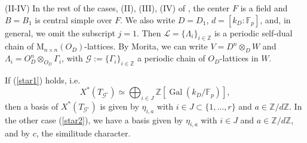 \documentclass[reqno, 10pt]{amsart}
\newcommand{\BF}{\ensuremath{\mathbb {F}}\xspace}
\newcommand{\BZ}{\ensuremath{\mathbb {Z}}\xspace}
\newcommand{\CG}{\ensuremath{\mathcal {G}}\xspace}
\newcommand{\RM}{\ensuremath{\mathrm {M}}\xspace}
\DeclareMathOperator{\Gal}{Gal}
\theoremstyle{definition}
\numberwithin{equation}{subsection}
\numberwithin{subsubsection}{subsection}
\begin{document}
(II-IV)  In the rest of the cases, (II), (III), (IV) of \cite[p. 135]{RZbook}, the center $F$ is a field and  $B=B_1$ is central simple over $F$.
 We also write $D=D_1$, $d=[k_D:\BF_p]$, and, in general, we omit the subscript $j=1$. Then $\mathscr L=\{\Lambda_i\}_{i\in \BZ}$ is a periodic self-dual chain of $\RM_{n\times n}(O_D)$-lattices. By Morita, we can write $V=D^n\otimes_D W$ and $\Lambda_i=O_D^n\otimes_{O_D}\Gamma_i$, with $\mathscr G:=\{\Gamma_i\}_{i\in \BZ}$ a periodic chain of $O_D$-lattices in $W$.
 
  
If (\ref{star1}) holds, i.e.
  \[
X^*(T_{\CG^\circ})\simeq  \bigoplus_{i\in J}\BZ[\Gal(k_{D}/\BF_p)], 
\]
 then a basis of $X^*(T_{\CG^\circ})$ is given by $\eta_{i, a}$ with $i\in J\subset \{1,\ldots, r\}$ and $a\in \BZ/d\BZ$.
 In the other case (\ref{star2}), we have a basis given by $\eta_{i, a}$ with $i\in J$ and $a\in \BZ/d\BZ$, and by $c$, the similitude character.
 \medskip
\end{document}
